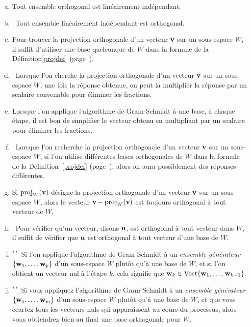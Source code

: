 \begin{prob}
\medskip
\begin{enumerate}[a)]
\item Tout ensemble orthogonal est linéairement indépendant.
\medskip
 
\item\sov~Tout ensemble linéairement indépendant est orthogonal.
\medskip
 
\item Pour trouver la projection orthogonale d'un vecteur $\mathbf{v}$ sur un sous-espace $W$, il suffit d'utiliser une base quelconque de $W$ dans la formule de la Définition\ref{projdef} (page~\pageref{projdef}).  
\medskip
 
\item\sov~Lorsque l'on cherche la projection orthogonale d'un vecteur $\mathbf{v}$ sur un sous-espace $W$, une fois la réponse obtenue, on peut la multiplier la réponse par un  scalaire convenable pour éliminer les fractions.
\medskip
 
\item Lorsque l'on applique l'algorithme de Gram-Schmidt à une base, à chaque étape, il est bon de simplifier le vecteur obtenu en multipliant par un scalaire pour éliminer les fractions.
\medskip
  
\item\sov~Lorsque l'on recherche la projection orthogonale d'un vecteur $\mathbf{v}$ sur un sous-espace $W$, si l'on utilise différentes bases orthogonales de $W$ dans la formule de la Définition~\ref{projdef} (page~\pageref{projdef}), alors on aura possiblement des réponses différentes.
\medskip
 
\item Si $\operatorname{proj}_W(\mathbf{v})$ désigne la projection orthogonale d'un vecteur $\mathbf{v}$ sur un sous-espace $W$, alors le vecteur $\mathbf{v}-\operatorname{proj}_W(\mathbf{v})$ est toujours orthogonal à tout vecteur de $W$.
\medskip
 
\item\sov~Pour vérifier qu'un vecteur, disons $\mathbf{u}$, est orthogonal à tout vecteur dans $W$, il suffit de vérifier que $\mathbf{u}$ est orthogonal à tout vecteur d'une base de $W$.
\medskip
 
\item$^{\ast \ast}$ Si l'on applique l'algorithme de Gram-Schmidt à un {\it ensemble g\'en\'erateur} $\{\mathbf{w}_1, \dots , \mathbf{w}_p\}$ d'un sous-espace $W$ plutôt qu'à une base de $W$, et si l'on obtient un vecteur nul \`a l'\'etape $k$, cela signifie que $\mathbf{w}_k \in \operatorname{ Vect} \normalsize\{\mathbf{w}_1, \dots , \mathbf{w}_{k-1}\normalsize\}$.
\medskip
 
\item $^{\ast \ast}$ Si vous appliquez l'algorithme de Gram-Schmidt à un {\it ensemble g\'en\'erateur} $\{\mathbf{w}_1, \dots , \mathbf{w}_m\}$ d'un sous-espace $W$ plutôt qu'à une base de $W$, et que vous écartez tous les vecteurs nuls qui apparaissent au cours du processus, alors vous obtiendrez bien au final une base orthogonale pour $W$.
\medskip
 
\end{enumerate}
\end{prob}
  
